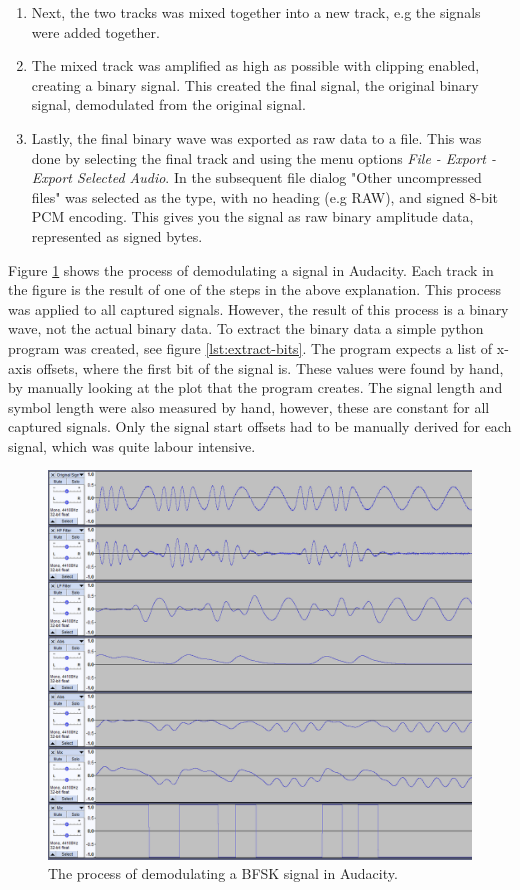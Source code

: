 \begin{enumerate}
    \item Next, the two tracks was mixed together into a new track, e.g the signals were added together.

    \item The mixed track was amplified as high as possible with clipping enabled, creating a binary signal. This created the final signal, the original binary signal, demodulated from the original signal.
    
    \item Lastly, the final binary wave was exported as raw data to a file. This was done by selecting the final track and using the menu options \textit{File - Export - Export Selected Audio}. In the subsequent file dialog "Other uncompressed files" was selected as the type, with no heading (e.g RAW), and signed 8-bit PCM encoding. This gives you the signal as raw binary amplitude data, represented as signed bytes.
\end{enumerate}
Figure \ref{fig:audacity-demodulation} shows the process of demodulating a signal in Audacity. Each track in the figure is the result of one of the steps in the above explanation. This process was applied to all captured signals. However, the result of this process is a binary wave, not the actual binary data. To extract the binary data a simple python program was created, see figure \ref{lst:extract-bits}. The program expects a list of x-axis offsets, where the first bit of the signal is. These values were found by hand, by manually looking at the plot that the program creates. The signal length and symbol length were also measured by hand, however, these are constant for all captured signals. Only the signal start offsets had to be manually derived for each signal, which was quite labour intensive.
\begin{figure}[!ht]
    \centering
    \includegraphics[width=\textwidth]{images/6-pentesting/audacity-demodulation.png}
    \caption{The process of demodulating a BFSK signal in Audacity.}
    \label{fig:audacity-demodulation}
\end{figure}
